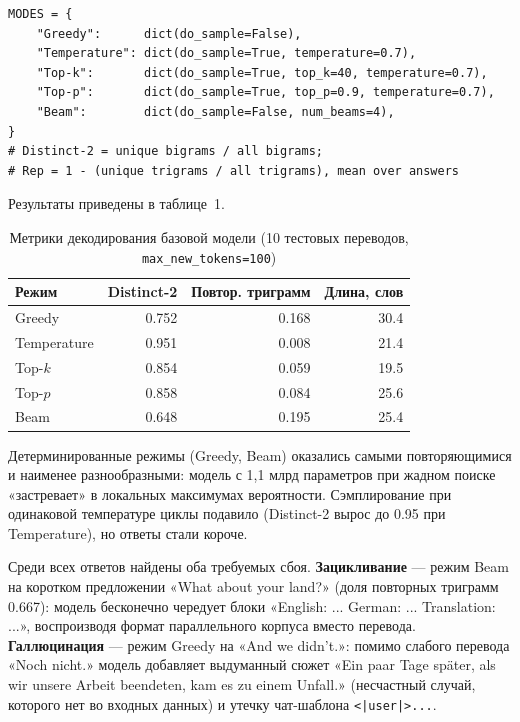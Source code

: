 \documentclass[14pt,a4paper]{extarticle}
\begin{document}
\begin{lstlisting}
MODES = {
    "Greedy":      dict(do_sample=False),
    "Temperature": dict(do_sample=True, temperature=0.7),
    "Top-k":       dict(do_sample=True, top_k=40, temperature=0.7),
    "Top-p":       dict(do_sample=True, top_p=0.9, temperature=0.7),
    "Beam":        dict(do_sample=False, num_beams=4),
}
# Distinct-2 = unique bigrams / all bigrams;
# Rep = 1 - (unique trigrams / all trigrams), mean over answers
\end{lstlisting}
\label{fig:modes}

Результаты приведены в таблице~1.

\begin{table}[H]
    \centering
    \caption*{\raggedleft Метрики декодирования базовой модели (10 тестовых переводов, \texttt{max\_new\_tokens=100})}
    \label{tab:dec}
    \begin{tabular}{lrrr}
        \toprule
        Режим & Distinct-2 & Повтор. триграмм & Длина, слов \\
        \midrule
        Greedy      & 0.752 & 0.168 & 30.4 \\
        Temperature & 0.951 & 0.008 & 21.4 \\
        Top-$k$     & 0.854 & 0.059 & 19.5 \\
        Top-$p$     & 0.858 & 0.084 & 25.6 \\
        Beam        & 0.648 & 0.195 & 25.4 \\
        \bottomrule
    \end{tabular}
\end{table}

Детерминированные режимы (Greedy, Beam) оказались самыми повторяющимися и наименее
разнообразными: модель с 1,1 млрд параметров при жадном поиске «застревает» в
локальных максимумах вероятности. Сэмплирование при одинаковой температуре циклы
подавило (Distinct-2 вырос до 0.95 при Temperature), но ответы стали короче.

Среди всех ответов найдены оба требуемых сбоя. \textbf{Зацикливание} --- режим Beam
на коротком предложении «What about your land?» (доля повторных триграмм 0.667):
модель бесконечно чередует блоки «English: ... German: ... Translation: ...»,
воспроизводя формат параллельного корпуса вместо перевода. \textbf{Галлюцинация} ---
режим Greedy на «And we didn't.»: помимо слабого перевода «Noch nicht.» модель
добавляет выдуманный сюжет «Ein paar Tage sp\"ater, als wir unsere Arbeit beendeten,
kam es zu einem Unfall.» (несчастный случай, которого нет во входных данных) и
утечку чат-шаблона \texttt{<|user|>...}.
\end{document}
